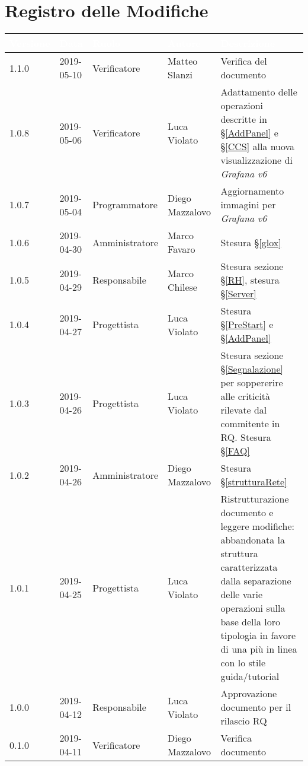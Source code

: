 \section*{Registro delle Modifiche}

\begin{center}
\begin{longtable}[c]{|m{}|m{}|m{}|m{}|p{}|}
\hline
\rowcolor{bluelogo}\textbf{\textcolor{white}{Versione}} & \textbf{\textcolor{white}{Data}} & \textbf{\textcolor{white}{Ruolo}} & \textbf{\textcolor{white}{Autore}} & \textbf{\textcolor{white}{Descrizione}} \\
\hline \hline
\endhead
\rowcolor{grigio} 1.1.0 & 2019-05-10 & Verificatore & Matteo Slanzi & Verifica del documento \\ 
\hline
1.0.8 & 2019-05-06 & Verificatore & Luca Violato & Adattamento delle operazioni descritte in §\ref{AddPanel} e §\ref{CCS} alla nuova visualizzazione di \textit{Grafana v6}\\
\hline
\rowcolor{grigio}1.0.7 & 2019-05-04 & Programmatore & Diego Mazzalovo & Aggiornamento immagini per \textit{Grafana v6}\\
\hline
1.0.6 & 2019-04-30 & Amministratore & Marco Favaro & Stesura §\ref{glox}\\
\hline
\rowcolor{grigio}1.0.5 & 2019-04-29 & Responsabile & Marco Chilese & Stesura sezione §\ref{RH}, stesura §\ref{Server}\\
\hline
1.0.4 & 2019-04-27 & Progettista & Luca Violato & Stesura §\ref{PreStart} e §\ref{AddPanel}\\
\hline
\rowcolor{grigio}1.0.3 & 2019-04-26 & Progettista & Luca Violato & Stesura sezione §\ref{Segnalazione} per soppererire alle criticità rilevate dal commitente in RQ. Stesura §\ref{FAQ}\\
\hline
1.0.2 & 2019-04-26 & Amministratore & Diego Mazzalovo & Stesura §\ref{strutturaRete}\\
\hline
\rowcolor{grigio}1.0.1 & 2019-04-25 & Progettista & Luca Violato & Ristrutturazione documento e leggere modifiche: abbandonata la struttura caratterizzata dalla separazione delle varie operazioni sulla base della loro tipologia in favore di una più in linea con lo stile guida/tutorial\\
\hline
1.0.0 & 2019-04-12 & Responsabile & Luca Violato & Approvazione documento per il rilascio RQ \\
\hline
\rowcolor{grigio}0.1.0 & 2019-04-11 & Verificatore & Diego Mazzalovo & Verifica documento \\

\end{longtable}
\end{center}
